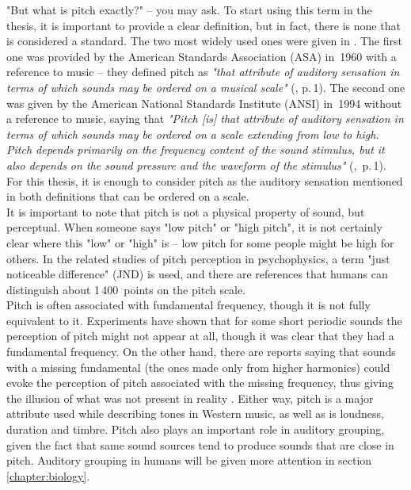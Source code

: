 "But what is pitch exactly?" -- you may ask. To start using this term in the thesis, it is important to provide a clear definition, but in fact, there is none that is considered a standard. The two most widely used ones were given in \cite{Plack2005}. The first one was provided by the American Standards Association (ASA) in~1960 with a reference to music -- they defined pitch as \textit{"that attribute of auditory sensation in terms of which sounds may be ordered on a musical scale"} (\cite{Plack2005}, p.\,1). The second one was given by the American National Standards Institute (ANSI) in~1994 without a reference to music, saying that \textit{"Pitch [is] that attribute of auditory sensation in terms of which sounds may be ordered on a scale extending from low to high. Pitch depends primarily on the frequency content of the sound stimulus, but it also depends on the sound pressure and the waveform of the stimulus"} (\cite{Plack2005},~p.\,1). For this thesis, it is enough to consider pitch as the auditory sensation mentioned in both definitions that can be ordered on a scale.\\

It is important to note that pitch is not a physical property of sound, but perceptual. When someone says "low pitch" or "high pitch", it is not certainly clear where this "low" or "high" is -- low pitch for some people might be high for others. In the related studies of pitch perception in psychophysics, a term "just noticeable difference" (JND) is used, and there are references that humans can distinguish about 1\,400~points on the pitch scale.\\

Pitch is often associated with fundamental frequency, though it is not fully equivalent to it. Experiments have shown that for some short periodic sounds the perception of pitch might not appear at all, though it was clear that they had a fundamental frequency. On the other hand, there are reports saying that sounds with a missing fundamental (the ones made only from higher harmonics) could evoke the perception of pitch associated with the missing frequency, thus giving the illusion of what was not present in reality \cite{Schnupp2011}. Either way, pitch is a major attribute used while describing tones in Western music, as well as is loudness, duration and timbre. Pitch also plays an important role in auditory grouping, given the fact that same sound sources tend to produce sounds that are close in pitch. Auditory grouping in humans will be given more attention in section \ref{chapter:biology}.

